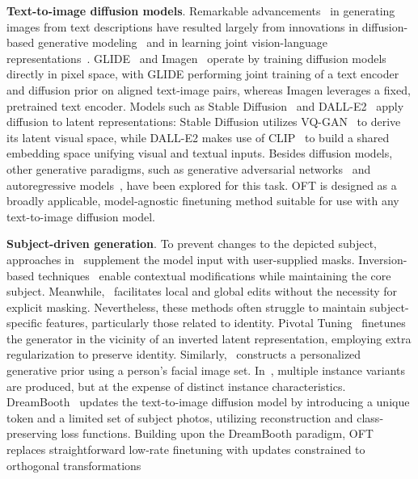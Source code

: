 \textbf{Text-to-image diffusion models}. Remarkable advancements~\cite{saharia2022photorealistic,ramesh2022hierarchical,rombach2022high,gu2022vector,nichol2022glide} in generating images from text descriptions have resulted largely from innovations in diffusion-based generative modeling~\cite{ho2020denoising,song2021score,song2021denoising,dhariwal2021diffusion} and in learning joint vision-language representations~\cite{su2020vlbert,lu2019vilbert,radford2021learning,wang2021simvlm,li2022blip,li2023blip,alayrac2022flamingo,schuhmann2022laion}. GLIDE~\cite{nichol2022glide} and Imagen~\cite{saharia2022photorealistic} operate by training diffusion models directly in pixel space, with GLIDE performing joint training of a text encoder and diffusion prior on aligned text-image pairs, whereas Imagen leverages a fixed, pretrained text encoder. Models such as Stable Diffusion~\cite{rombach2022high} and DALL-E2~\cite{ramesh2022hierarchical} apply diffusion to latent representations: Stable Diffusion utilizes VQ-GAN~\cite{esser2021taming} to derive its latent visual space, while DALL-E2 makes use of CLIP~\cite{radford2021learning} to build a shared embedding space unifying visual and textual inputs. Besides diffusion models, other generative paradigms, such as generative adversarial networks~\cite{reed2016generative,zhang2017stackgan,xu2018attngan,li2019controllable} and autoregressive models~\cite{ramesh2021zero,ding2021cogview,wu2022nuwa,yuscaling}, have been explored for this task. OFT is designed as a broadly applicable, model-agnostic finetuning method suitable for use with any text-to-image diffusion model.

\textbf{Subject-driven generation}. To prevent changes to the depicted subject, approaches in~\cite{avrahami2022blended,nichol2022glide} supplement the model input with user-supplied masks. Inversion-based techniques~\cite{choi2021ilvr,dhariwal2021diffusion,ramesh2022hierarchical,gal2022image} enable contextual modifications while maintaining the core subject. Meanwhile,~\cite{hertz2022prompt} facilitates local and global edits without the necessity for explicit masking. Nevertheless, these methods often struggle to maintain subject-specific features, particularly those related to identity. Pivotal Tuning~\cite{roich2022pivotal} finetunes the generator in the vicinity of an inverted latent representation, employing extra regularization to preserve identity. Similarly,~\cite{nitzan2022mystyle} constructs a personalized generative prior using a person’s facial image set. In~\cite{casanova2021instance}, multiple instance variants are produced, but at the expense of distinct instance characteristics. DreamBooth~\cite{ruiz2023dreambooth} updates the text-to-image diffusion model by introducing a unique token and a limited set of subject photos, utilizing reconstruction and class-preserving loss functions. Building upon the DreamBooth paradigm, OFT replaces straightforward low-rate finetuning with updates constrained to orthogonal transformations

